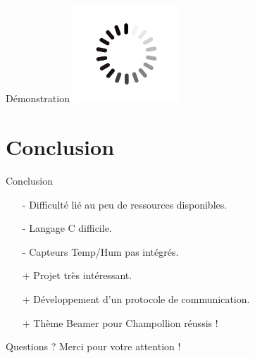 \documentclass{beamer}
\begin{document}
\begin{frame}{Démonstration}
    \centering 
    \includegraphics[width=0.3\textwidth]{images/loading_icon.jpg}
\end{frame}


\section{Conclusion}

\begin{frame}{Conclusion}
    \begin{itemize}
        \item[-] Difficulté lié au peu de ressources disponibles. 
        \item[-] Langage C difficile. 
        \item[-] Capteurs Temp/Hum pas intégrés. 
        \item[+] Projet très intéressant.  
        \item[+] Développement d'un protocole de communication. 
        \item[+] Thème Beamer pour Champollion réussis ! 
    \end{itemize}
\end{frame}

\begin{frame}{Questions ?}
    \centering
    \huge Merci pour votre attention !
\end{frame}
\end{document}
